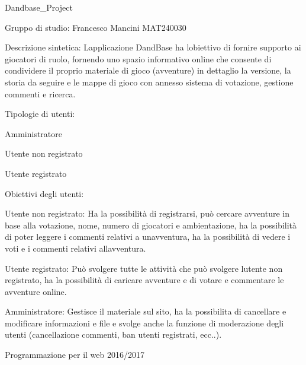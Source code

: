 Dandbase\+\_\+\+Project

Gruppo di studio\+: Francesco Mancini M\+A\+T240030

Descrizione sintetica\+: L\textquotesingle{}applicazione Dand\+Base ha l\textquotesingle{}obiettivo di fornire supporto ai giocatori di ruolo, fornendo uno spazio informativo online che consente di condividere il proprio materiale di gioco (avventure) in dettaglio la versione, la storia da seguire e le mappe di gioco con annesso sistema di votazione, gestione commenti e ricerca.

Tipologie di utenti\+:
\begin{DoxyItemize}
\item Amministratore
\item Utente non registrato
\item Utente registrato
\end{DoxyItemize}

Obiettivi degli utenti\+:
\begin{DoxyItemize}
\item Utente non registrato\+: Ha la possibilità di registrarsi, può cercare avventure in base alla votazione, nome, numero di giocatori e ambientazione, ha la possibilità di poter leggere i commenti relativi a un\textquotesingle{}avventura, ha la possibilità di vedere i voti e i commenti relativi all\textquotesingle{}avventura.
\item Utente registrato\+: Può svolgere tutte le attività che può svolgere l\textquotesingle{}utente non registrato, ha la possibilità di caricare avventure e di votare e commentare le avventure online.
\item Amministratore\+: Gestisce il materiale sul sito, ha la possibilita di cancellare e modificare informazioni e file e svolge anche la funzione di moderazione degli utenti (cancellazione commenti, ban utenti registrati, ecc..).
\end{DoxyItemize}

Programmazione per il web 2016/2017  